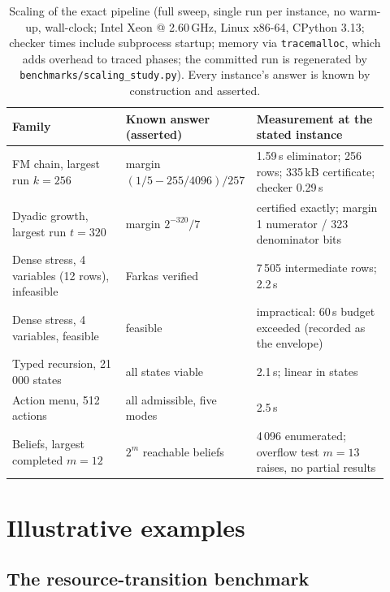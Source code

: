 \documentclass[11pt]{article}
\begin{document}
\begin{table}[t]
\centering\footnotesize
\setlength{\tabcolsep}{3pt}
\begin{tabular}{@{}p{0.30\linewidth}p{0.27\linewidth}p{0.35\linewidth}@{}}
\toprule
Family & Known answer (asserted) & Measurement at the stated instance \\
\midrule
FM chain, largest run $k = 256$ & margin $(1/5 - 255/4096)/257$ &
1.59\,s eliminator; 256 rows; 335\,kB certificate; checker 0.29\,s \\
Dyadic growth, largest run $t = 320$ & margin $2^{-320}/7$ & certified
exactly; margin 1 numerator / 323 denominator bits \\
Dense stress, 4 variables (12 rows), infeasible & Farkas verified &
7\,505 intermediate rows; 2.2\,s \\
Dense stress, 4 variables, feasible & feasible & impractical: 60\,s
budget exceeded (recorded as the envelope) \\
Typed recursion, 21\,000 states & all states viable & 2.1\,s; linear in
states \\
Action menu, 512 actions & all admissible, five modes & 2.5\,s \\
Beliefs, largest completed $m = 12$ & $2^{m}$ reachable beliefs &
4\,096 enumerated; overflow test $m = 13$ raises, no partial results \\
\bottomrule
\end{tabular}
\caption{Scaling of the exact pipeline (full sweep, single run per
instance, no warm-up, wall-clock; Intel Xeon @ 2.60\,GHz, Linux x86-64,
CPython 3.13; checker times include subprocess startup; memory via
\texttt{tracemalloc}, which adds overhead to traced phases; the committed
run is regenerated by \texttt{benchmarks/scaling\_study.py}). Every
instance's answer is known by construction and asserted.}
\label{tab:scaling}
\end{table}

\section{Illustrative examples}\label{sec:examples}

\subsection{The resource-transition benchmark}\label{sec:benchmark}
\end{document}
